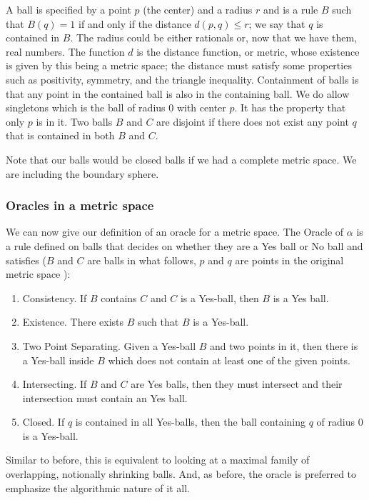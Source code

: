 \documentclass[12pt]{article}
\theoremstyle{remark}
\begin{document}
A ball is specified by a point $p$ (the center) and a radius $r$ and is a rule $B$ such that $B(q) = 1$ if and only if the distance $d(p,q) \leq r$; we say that $q$ is contained in $B$. The radius could be either rationals or, now that we have them, real numbers. The function $d$ is the distance function, or metric, whose existence is given by this being a metric space; the distance must satisfy some properties such as positivity, symmetry, and the triangle inequality. Containment of balls is that any point in the contained ball is also in the containing ball. We do allow singletons which is the ball of radius $0$ with center $p$. It has the property that only $p$ is in it. Two balls $B$ and $C$ are disjoint if there does not exist any point $q$ that is contained in both $B$ and $C$.

Note that our balls would be closed balls if we had a complete metric space. We are including the boundary sphere. 

\subsubsection{Oracles in a metric space}

We can now give our definition of an oracle for a metric space. The Oracle of $\alpha$ is a rule defined on balls that decides on whether they are a Yes ball or No ball and satisfies ($B$ and $C$ are balls in what follows, $p$ and $q$ are points in the original metric space ): 
\begin{enumerate}
    \item Consistency. If $B$ contains $C$ and $C$ is a Yes-ball, then $B$ is a Yes ball.
    \item Existence. There exists $B$ such that $B$ is a Yes-ball.
    \item Two Point Separating. Given a Yes-ball $B$ and two points in it, then there is a Yes-ball inside $B$ which does not contain at least one of the given points. 
    \item Intersecting. If $B$ and $C$ are Yes balls, then they must intersect and their intersection must contain an Yes ball.
    \item Closed. If $q$ is contained in all Yes-balls, then the ball containing $q$ of radius 0 is a Yes-ball. 
\end{enumerate}

Similar to before, this is equivalent to looking at a maximal family of overlapping, notionally shrinking balls. And, as before, the oracle is preferred to emphasize the algorithmic nature of it all. 
\end{document}
